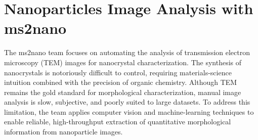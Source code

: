 




\section{Nanoparticles Image Analysis with ms2nano}

%

The ms2nano team focuses on automating the analysis of transmission electron microscopy (TEM) images for nanocrystal characterization. The synthesis of nanocrystals is notoriously difficult to control, requiring materials-science intuition combined with the precision of organic chemistry. Although TEM remains the gold standard for morphological characterization, manual image analysis is slow, subjective, and poorly suited to large datasets. To address this limitation, the team applies computer vision and machine-learning techniques to enable reliable, high-throughput extraction of quantitative morphological information from nanoparticle images.


